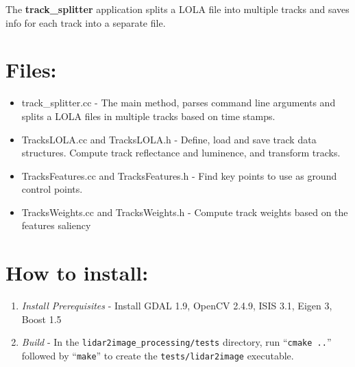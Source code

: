 \documentclass[float=false, crop=false]{standalone}
\begin{document}
The {\bf{track\_splitter}} application splits a LOLA file into multiple tracks and saves info for each track into
a separate file.

\section{Files:}

\begin{itemize}
\item{track\_splitter.cc - The main method, parses command line arguments and splits a LOLA files in multiple
  tracks based on time stamps.}
\item{TracksLOLA.cc and TracksLOLA.h - Define, load and save track data structures. Compute track reflectance and
luminence, and transform tracks.} 
\item{TracksFeatures.cc and TracksFeatures.h - Find key points to use as ground control points.}
\item{TracksWeights.cc and TracksWeights.h - Compute track weights based on the features saliency} 
\end{itemize}

\section{How to install:}
\begin{enumerate}
	\item{\emph{Install Prerequisites}} - Install GDAL 1.9, OpenCV 2.4.9, ISIS 3.1, Eigen 3, Boost 1.5
	\item{\emph{Build }} - In the \texttt{lidar2image\_processing/tests} directory,
          run ``\texttt{cmake ..}'' followed by ``\texttt{make}'' to create the {\texttt{tests/lidar2image}}
          executable.
\end{enumerate}
\end{document}
